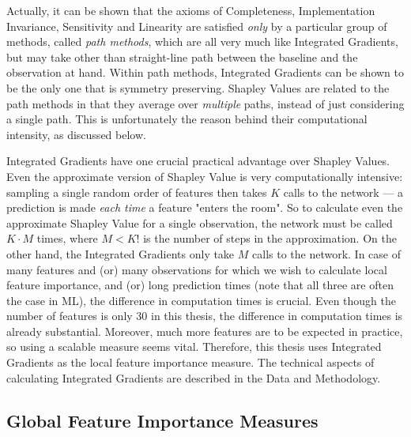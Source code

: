 			Actually, it can be shown \citep{sundararajan2017axiomatic} that the axioms of Completeness, Implementation Invariance, Sensitivity and Linearity are satisfied \textit{only} by a particular group of methods, called \textit{path methods}, which are all very much like Integrated Gradients, but may take other than straight-line path between the baseline and the observation at hand. Within path methods, Integrated Gradients can be shown \citep{sundararajan2017axiomatic} to be the only one that is symmetry preserving. Shapley Values are related to the path methods in that they average over \textit{multiple} paths, instead of just considering a single path. This is unfortunately the reason behind their computational intensity, as discussed below.  
			
			Integrated Gradients have one crucial practical advantage over Shapley Values. Even the approximate version of Shapley Value \citep{vstrumbelj2014explaining} is very computationally intensive: sampling a single random order of features then takes $K$ calls to the network --- a prediction is made \textit{each time} a feature "enters the room". So to calculate even the approximate Shapley Value for a single observation, the network must be called $K\cdot M$ times, where $M < K!$ is the number of steps in the approximation. On the other hand, the Integrated Gradients only take $M$ calls to the network. In case of many features and (or) many observations for which we wish to calculate local feature importance, and (or) long prediction times (note that all three are often the case in ML), the difference in computation times is crucial. Even though the number of features is only 30 in this thesis, the difference in computation times is already substantial. Moreover, much more features are to be expected in practice, so using a scalable measure seems vital. Therefore, this thesis uses Integrated Gradients as the local feature importance measure. The technical aspects of calculating Integrated Gradients are described in the Data and Methodology. 
		
		
		\subsection{Global Feature Importance Measures} 
		
